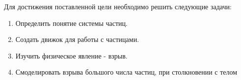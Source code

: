 	Для достижения поставленной цели необходимо решить следующие задачи:
	\begin{enumerate}
		\item Определить понятие системы частиц. 
		\item Создать движок для работы с частицами. 
		\item Изучить физическое явление - взрыв. 
		\item Смоделировать взрыва большого числа частиц, при столкновении с телом
	\end{enumerate}



